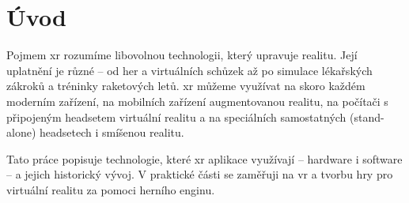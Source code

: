 \chapter*{Úvod}

Pojmem \gls{xr} rozumíme libovolnou technologii, který upravuje realitu. Její uplatnění je různé -- od her a virtuálních schůzek až po simulace lékařských zákroků a tréninky raketových letů. \cite{muni_kybernetika} \gls{xr} můžeme využívat na skoro každém moderním zařízení, na mobilních zařízení augmentovanou realitu, na počítači s připojeným headsetem virtuální realitu a na speciálních samostatných (stand-alone) headsetech i smíšenou realitu. 

Tato práce popisuje technologie, které \gls{xr} aplikace využívají -- hardware i software -- a jejich historický vývoj. V praktické části se zaměřuji na \gls{vr} a tvorbu hry pro virtuální realitu za pomoci herního enginu.  